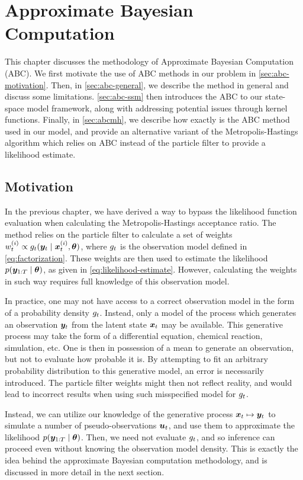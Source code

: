 \chapter{Approximate Bayesian Computation}
\label{chap:abc}

This chapter discusses the methodology of Approximate Bayesian Computation (ABC). We first motivate the use of ABC methods in our problem in \autoref{sec:abc-motivation}. Then, in \autoref{sec:abc-general}, we describe the method in general and discuss some limitations. \autoref{sec:abc-ssm} then introduces the ABC to our state-space model framework, along with addressing potential issues through kernel functions. Finally, in \autoref{sec:abcmh}, we describe how exactly is the ABC method used in our model, and provide an alternative variant of the Metropolis-Hastings algorithm which relies on ABC instead of the particle filter to provide a likelihood estimate.


\section{Motivation} \label{sec:abc-motivation}
In the previous chapter, we have derived a way to bypass the likelihood function evaluation when calculating the Metropolis-Hastings acceptance ratio. The method relies on the particle filter to calculate a set of weights $w_t^{(i)} \propto g_t(\bm{y}_t \mid \bm{x}_t^{(i)}, \bm{\theta})$, where $g_t$ is the observation model defined in \eqref{eq:factorization}. These weights are then used to estimate the likelihood $p(\bm{y}_{1:T} \mid \bm{\theta})$, as given in \eqref{eq:likelihood-estimate}. However, calculating the weights in such way requires full knowledge of this observation model.

In practice, one may not have access to a correct observation model in the form of a probability density $g_t$. Instead, only a model of the process which generates an observation $\bm{y}_t$ from the latent state $\bm{x}_t$ may be available. This generative process may take the form of a differential equation, chemical reaction, simulation, etc. One is then in possession of a mean to generate an observation, but not to evaluate how probable it is. By attempting to fit an arbitrary probability distribution to this generative model, an error is necessarily introduced. The particle filter weights might then not reflect reality, and would lead to incorrect results when using such misspecified model for $g_t$.

Instead, we can utilize our knowledge of the generative process $\bm{x}_t \mapsto \bm{y}_t$ to simulate a number of pseudo-observations $\bm{u}_t$, and use them to approximate the likelihood $p(\bm{y}_{1:T} \mid \bm{\theta})$. Then, we need not evaluate $g_t$, and so inference can proceed even without knowing the observation model density. This is exactly the idea behind the approximate Bayesian computation methodology, and is discussed in more detail in the next section.


